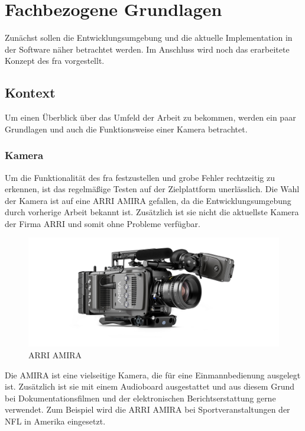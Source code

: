 \chapter{Fachbezogene Grundlagen} \label{sec:fachgrund}
Zunächst sollen die Entwicklungsumgebung und die aktuelle Implementation in der Software näher betrachtet werden. Im Anschluss wird noch das erarbeitete Konzept des \ac{fra} vorgestellt.

\section{Kontext}
Um einen Überblick über das Umfeld der Arbeit zu bekommen, werden ein paar Grundlagen und auch die Funktionsweise einer Kamera betrachtet. 

\subsection{Kamera}
Um die Funktionalität des \ac{fra} festzustellen und grobe Fehler rechtzeitig zu erkennen, ist das regelmäßige Testen auf der Zielplattform unerlässlich. 
Die Wahl der Kamera ist auf eine \ac{ARRI} AMIRA gefallen, da die Entwicklungsumgebung durch vorherige Arbeit bekannt ist. Zusätzlich ist sie nicht die aktuellste Kamera der Firma \ac{ARRI} und somit ohne Probleme verfügbar.

\begin{figure}[!hbtp]
	\centering
	\includegraphics[width = 0.7\linewidth]{pictures/amira-product-image-data.jpg}
	\smallskip
	\caption{ARRI AMIRA \protect\footnotemark[2]}
	\label{fig:amira}
\end{figure}  

Die AMIRA ist eine vielseitige Kamera, die für eine Einmannbedienung ausgelegt ist.
Zusätzlich ist sie mit einem Audioboard ausgestattet und aus diesem Grund bei Dokumentationsfilmen und der elektronischen Berichtserstattung gerne verwendet. Zum Beispiel wird die \ac{ARRI} AMIRA bei Sportveranstaltungen der NFL in Amerika eingesetzt. \cite{arrinewsamira} 

